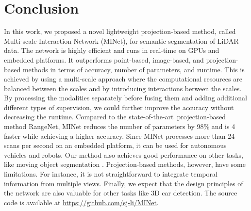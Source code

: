 \documentclass[letterpaper, 10 pt, journal, twoside]{ieeetran}
\def\sArt{{state-of-the-art~}}
\begin{document}
\section{Conclusion}
In this work, we proposed a novel lightweight projection-based method, called Multi-scale Interaction Network (MINet), for semantic segmentation of LiDAR data. 
The network is highly efficient and runs in real-time on GPUs and embedded platforms. 
It outperforms point-based, image-based, and projection-based methods in terms of accuracy, number of parameters, and runtime. 
This is achieved by using a multi-scale approach where the computational resources are balanced between the scales and by introducing interactions between the scales. 
By processing the modalities separately before fusing them and adding additional different types of supervision, we could further improve the accuracy without decreasing the runtime. 
Compared to the \sArt projection-based method RangeNet, MINet reduces the number of parameters by 98\% and is 4 faster while achieving a higher accuracy. 
Since MINet processes more than 24 scans per second on an embedded platform, it can be used for autonomous vehicles and robots.
Our method also achieves good performance on other tasks, like moving object segmentation \cite{chen2021ral}.
Projection-based methods, however, have some limitations. For instance, it is not straightforward to integrate temporal information from multiple views. Finally, we expect that the design principles of the network are also valuable for other tasks like 3D car detection. The source code is available at \url{https://github.com/sj-li/MINet}.













\end{document}
